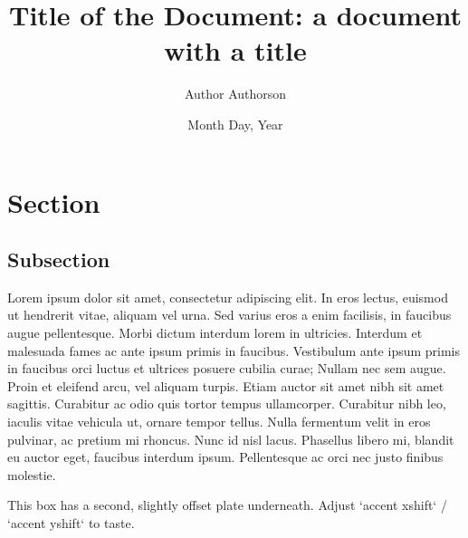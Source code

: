 \documentclass{article}
\begin{document}
\title{Title of the Document: a document with a title}
\author{Author Authorson}
\date{Month Day, Year}

\maketitle

\section{Section}

\subsection{Subsection}

Lorem ipsum dolor sit amet, consectetur adipiscing elit. In eros lectus, euismod ut hendrerit vitae, aliquam vel urna. Sed varius eros a enim facilisis, in faucibus augue pellentesque. Morbi dictum interdum lorem in ultricies. Interdum et malesuada fames ac ante ipsum primis in faucibus. Vestibulum ante ipsum primis in faucibus orci luctus et ultrices posuere cubilia curae; Nullam nec sem augue. Proin et eleifend arcu, vel aliquam turpis. Etiam auctor sit amet nibh sit amet sagittis. Curabitur ac odio quis tortor tempus ullamcorper. Curabitur nibh leo, iaculis vitae vehicula ut, ornare tempor tellus. Nulla fermentum velit in eros pulvinar, ac pretium mi rhoncus. Nunc id nisl lacus. Phasellus libero mi, blandit eu auctor eget, faucibus interdum ipsum. Pellentesque ac orci nec justo finibus molestie.

\begin{accentbox}[Lemma 2.33]
This box has a second, slightly offset plate underneath. Adjust
`accent xshift` / `accent yshift` to taste.
\end{accentbox}
\end{document}
